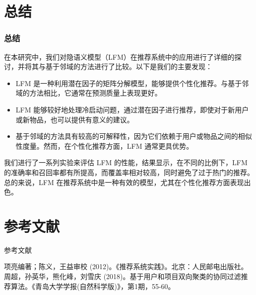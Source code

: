 \documentclass{beamer}
\begin{document}
\section{总结}
	\begin{frame}
	\frametitle{总结}
	在本研究中，我们对隐语义模型（LFM）在推荐系统中的应用进行了详细的探讨，并将其与基于邻域的方法进行了比较。以下是我们的主要发现：
		\begin{itemize}
  			\item LFM 是一种利用潜在因子的矩阵分解模型，能够提供个性化推荐。与基于邻域的方法相比，它通常在预测质量上表现更好。
  			\item LFM 能够较好地处理冷启动问题，通过潜在因子进行推荐，即使对于新用户或新物品，也可以提供有意义的建议。
  			\item 基于邻域的方法具有较高的可解释性，因为它们依赖于用户或物品之间的相似性度量。然而，在个性化推荐方面，LFM 通常更具优势。
		\end{itemize}
		我们进行了一系列实验来评估 LFM 的性能，结果显示，在不同的比例下，LFM 的准确率和召回率都有所提高，而覆盖率相对较高，同时避免了过于热门的推荐。\\
		总的来说，LFM 在推荐系统中是一种有效的模型，尤其在个性化推荐方面表现出色。
	\end{frame}
	
\section{参考文献}
	\begin{frame}{参考文献}
		\begin{thebibliography}{9}
			项亮编著；陈义，王益审校 (2012)。《推荐系统实践》。北京：人民邮电出版社。
			周超，孙英华，熊化峰，刘雪庆 (2018)。基于用户和项目双向聚类的协同过滤推荐算法。《青岛大学学报(自然科学版)》，第1期，55-60。
		\end{thebibliography}
	\end{frame}
\end{document}
